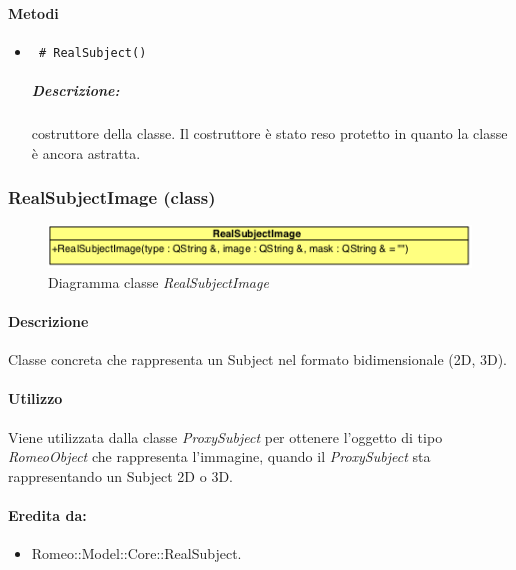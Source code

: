 \paragraph{\color{black}Metodi}
	\begin{itemize}
		\item \color{blue}\verb! # RealSubject()!
		\color{black}
		\subparagraph{Descrizione:} costruttore della classe. Il costruttore è stato reso protetto in quanto la classe è ancora astratta.
	\end{itemize}

\pagebreak
\color{black}
\subsubsection{RealSubjectImage (class)}
\label{RealSubject2D}
\begin{figure}[!h]
\centering
			\includegraphics[scale=1]{./Content/Immagini/modelCore/RealSubjectImage.png}
			\caption{Diagramma classe \textsl{RealSubjectImage}}
			\label{realSubject2d_img}
\end{figure}

\paragraph{Descrizione \\}
Classe concreta che rappresenta un Subject\g{} nel formato bidimensionale (2D, 3D).

\paragraph{Utilizzo \\}
Viene utilizzata dalla classe \textsl{ProxySubject} per ottenere l'oggetto di tipo \textsl{RomeoObject} che rappresenta l'immagine, quando il \textsl{ProxySubject} sta rappresentando un Subject\g{} 2D o 3D.

\paragraph{Eredita da:}
\begin{itemize}
	\item Romeo::Model::Core::RealSubject.
\end{itemize}

